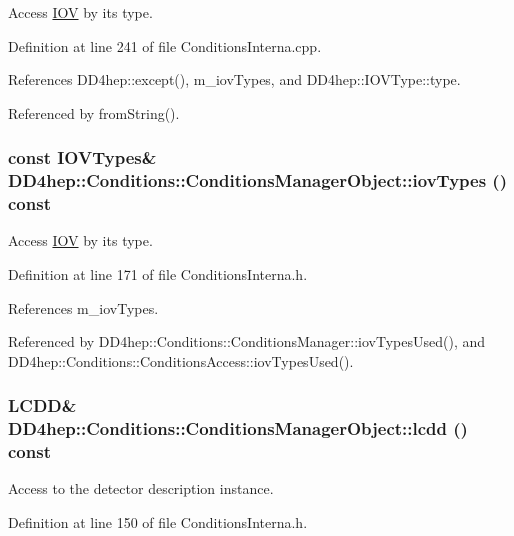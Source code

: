 Access \hyperlink{class_d_d4hep_1_1_i_o_v}{IOV} by its type. 

Definition at line 241 of file ConditionsInterna.cpp.

References DD4hep::except(), m\_\-iovTypes, and DD4hep::IOVType::type.

Referenced by fromString().\hypertarget{class_d_d4hep_1_1_conditions_1_1_conditions_manager_object_ab19f2ded7e79ae78aa18dbbb52bc0bba}{
\subsubsection[{iovTypes}]{\setlength{\rightskip}{0pt plus 5cm}const {\bf IOVTypes}\& DD4hep::Conditions::ConditionsManagerObject::iovTypes () const}}
\label{class_d_d4hep_1_1_conditions_1_1_conditions_manager_object_ab19f2ded7e79ae78aa18dbbb52bc0bba}


Access \hyperlink{class_d_d4hep_1_1_i_o_v}{IOV} by its type. 

Definition at line 171 of file ConditionsInterna.h.

References m\_\-iovTypes.

Referenced by DD4hep::Conditions::ConditionsManager::iovTypesUsed(), and DD4hep::Conditions::ConditionsAccess::iovTypesUsed().\hypertarget{class_d_d4hep_1_1_conditions_1_1_conditions_manager_object_ace8f542e07423795f472dac6e606121e}{
\subsubsection[{lcdd}]{\setlength{\rightskip}{0pt plus 5cm}LCDD\& DD4hep::Conditions::ConditionsManagerObject::lcdd () const}}
\label{class_d_d4hep_1_1_conditions_1_1_conditions_manager_object_ace8f542e07423795f472dac6e606121e}


Access to the detector description instance. 

Definition at line 150 of file ConditionsInterna.h.

